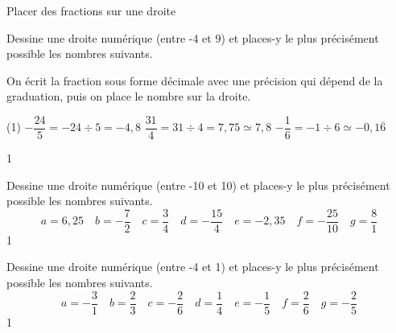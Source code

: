 \documentclass[a4paper,11pt]{report}
\begin{document}
\begin{resolu}{Placer des fractions sur une droite}{
Dessine une droite numérique (entre -4 et 9) et places-y le plus précisément possible les nombres suivants.

{\color{blue} On écrit la fraction sous forme décimale avec une précision qui dépend de la graduation, puis on place le nombre sur la droite. 
}

\begin{tasks}(1)
	\task $-\dfrac{24}{5}=-24\div 5=-4,8$
	\task $\dfrac{31}{4}=31\div 4=7,75\simeq 7,8$
	\task $-\dfrac{1}{6}=-1\div 6\simeq -0,1\overline{6}$
\end{tasks}
\centering
{}}{1}
\end{resolu}


\begin{exo}{
Dessine une droite numérique (entre -10 et 10) et places-y le plus précisément possible les nombres suivants.
\[
a=6,25 \quad b=-\dfrac{7}{2} \quad c=\dfrac{3}{4} \quad d=-\dfrac{15}{4} \quad e=-2,35 \quad f=-\dfrac{25}{10} \quad g=\dfrac{8}{1} 
\]}
{1}\end{exo}

\begin{exo}{
Dessine une droite numérique (entre -4 et 1) et places-y le plus précisément possible les nombres suivants.
\[
a=-\dfrac{3}{1} \quad b=\dfrac{2}{3} \quad c=-\dfrac{2}{6} \quad d=\dfrac{1}{4} \quad e=-\dfrac{1}{5} \quad f=\dfrac{2}{6} \quad
g=-\dfrac{2}{5}
\]}
{1}\end{exo}
\end{document}
